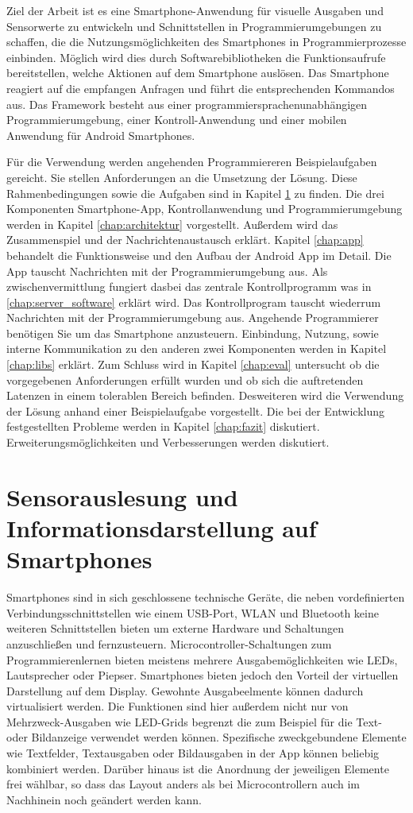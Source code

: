 \documentclass[11pt,a4paper]{report}
\begin{document}
Ziel der Arbeit ist es eine Smartphone-Anwendung für visuelle Ausgaben und Sensorwerte zu entwickeln und Schnittstellen in Programmierumgebungen zu schaffen, die die Nutzungsmöglichkeiten des Smartphones in Programmierprozesse einbinden.
Möglich wird dies durch Softwarebibliotheken die Funktionsaufrufe bereitstellen, welche Aktionen auf dem Smartphone auslösen.
Das Smartphone reagiert auf die empfangen Anfragen und führt die entsprechenden Kommandos aus.
Das Framework besteht aus einer programmiersprachenunabhängigen Programmierumgebung, einer Kontroll-Anwendung und einer mobilen Anwendung für Android Smartphones.

Für die Verwendung werden angehenden Programmiereren Beispielaufgaben gereicht.
Sie stellen Anforderungen an die Umsetzung der Lösung.
Diese Rahmenbedingungen sowie die Aufgaben sind in Kapitel \ref{chap:Experimente} zu finden.
Die drei Komponenten Smartphone-App, Kontrollanwendung und Programmierumgebung werden
in Kapitel \ref{chap:architektur} vorgestellt.
Außerdem wird das Zusammenspiel und der Nachrichtenaustausch erklärt.
Kapitel \ref{chap:app} behandelt die Funktionsweise und den Aufbau der Android App im Detail.
Die App tauscht Nachrichten mit der Programmierumgebung aus.
Als zwischenvermittlung fungiert dasbei das zentrale Kontrollprogramm was in \ref{chap:server_software} erklärt wird.
Das Kontrollprogram tauscht wiederrum Nachrichten mit der Programmierumgebung aus.
Angehende Programmierer benötigen Sie um das Smartphone anzusteuern.
Einbindung, Nutzung, sowie interne Kommunikation zu den anderen zwei Komponenten werden in Kapitel \ref{chap:libs} erklärt.
Zum Schluss wird in Kapitel \ref{chap:eval} untersucht ob die vorgegebenen Anforderungen erfüllt wurden und ob sich die auftretenden Latenzen in einem tolerablen Bereich befinden.
Desweiteren wird die Verwendung der Lösung anhand einer Beispielaufgabe vorgestellt.
Die bei der Entwicklung festgestellten Probleme werden in Kapitel \ref{chap:fazit} diskutiert.
Erweiterungsmöglichkeiten und Verbesserungen werden diskutiert.

\chapter{Sensorauslesung und Informationsdarstellung auf Smartphones} \label{chap:Experimente}
Smartphones sind in sich geschlossene technische Geräte, die neben vordefinierten Verbindungsschnittstellen wie einem USB-Port, WLAN und Bluetooth keine weiteren Schnittstellen bieten um externe Hardware und Schaltungen anzuschließen und fernzusteuern.
Microcontroller-Schaltungen zum Programmierenlernen bieten meistens mehrere Ausgabemöglichkeiten wie LEDs, Lautsprecher oder Piepser.
Smartphones bieten jedoch den Vorteil der virtuellen Darstellung auf dem Display.
Gewohnte Ausgabeelmente können dadurch virtualisiert werden.
Die Funktionen sind hier außerdem nicht nur von Mehrzweck-Ausgaben wie LED-Grids begrenzt die zum Beispiel für die Text- oder Bildanzeige verwendet werden können.
Spezifische zweckgebundene Elemente wie Textfelder, Textausgaben oder Bildausgaben in der App können beliebig kombiniert werden.
Darüber hinaus ist die Anordnung der jeweiligen Elemente frei wählbar, so dass das Layout anders als bei Microcontrollern auch im Nachhinein noch geändert werden kann.
\end{document}
